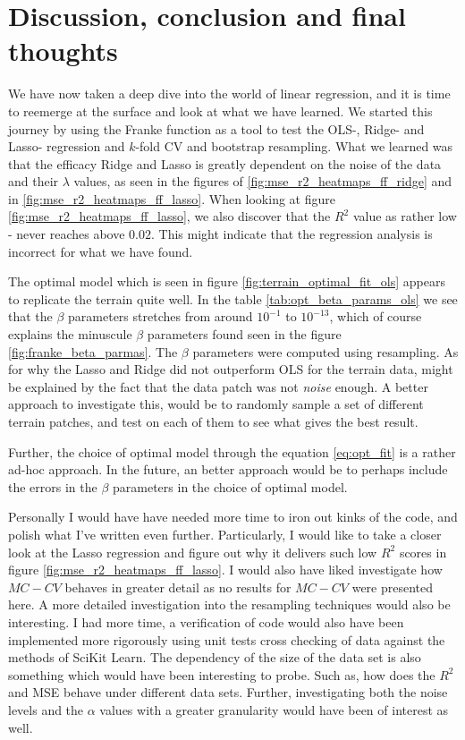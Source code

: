 \documentclass[11pt]{article}
\begin{document}
\section{Discussion, conclusion and final thoughts}
We have now taken a deep dive into the world of linear regression, and it is time to reemerge at the surface and look at what we have learned. We started this journey by using the Franke function as a tool to test the OLS-, Ridge- and Lasso- regression and $k$-fold CV and bootstrap resampling. What we learned was that the efficacy Ridge and Lasso is greatly dependent on the noise of the data and their $\lambda$ values, as seen in the figures of \ref{fig:mse_r2_heatmaps_ff_ridge} and in \ref{fig:mse_r2_heatmaps_ff_lasso}. When looking at figure \ref{fig:mse_r2_heatmaps_ff_lasso}, we also discover that the $R^2$ value as rather low - never reaches above $0.02$. This might indicate that the regression analysis is incorrect for what we have found.


The optimal model which is seen in figure \ref{fig:terrain_optimal_fit_ols} appears to replicate the terrain quite well. In the table \ref{tab:opt_beta_params_ols} we see that the $\beta$ parameters stretches from around $10^{-1}$ to $10^{-13}$, which of course explains the minuscule $\beta$ parameters found seen in the figure \ref{fig:franke_beta_parmas}. The $\beta$ parameters were computed using resampling. As for why the Lasso and Ridge did not outperform OLS for the terrain data, might be explained by the fact that the data patch was not \textit{noise} enough. A better approach to investigate this, would be to randomly sample a set of different terrain patches, and test on each of them to see what gives the best result.

Further, the choice of optimal model through the equation \eqref{eq:opt_fit} is a rather ad-hoc approach. In the future, an better approach would be to perhaps include the errors in the $\beta$ parameters in the choice of optimal model.

Personally I would have have needed more time to iron out kinks of the code, and polish what I've written even further. Particularly, I would like to take a closer look at the Lasso regression and figure out why it delivers such low $R^2$ scores in figure \ref{fig:mse_r2_heatmaps_ff_lasso}. I would also have liked investigate how $MC-CV$ behaves in greater detail as no results for $MC-CV$ were presented here. A more detailed investigation into the resampling techniques would also be interesting. I had more time, a verification of code would also have been implemented more rigorously using unit tests cross checking of data against the methods of SciKit Learn. The dependency of the size of the data set is also something which would have been interesting to probe. Such as, how does the $R^2$ and MSE behave under different data sets. Further, investigating both the noise levels and the $\alpha$ values with a greater granularity would have been of interest as well.
\end{document}

